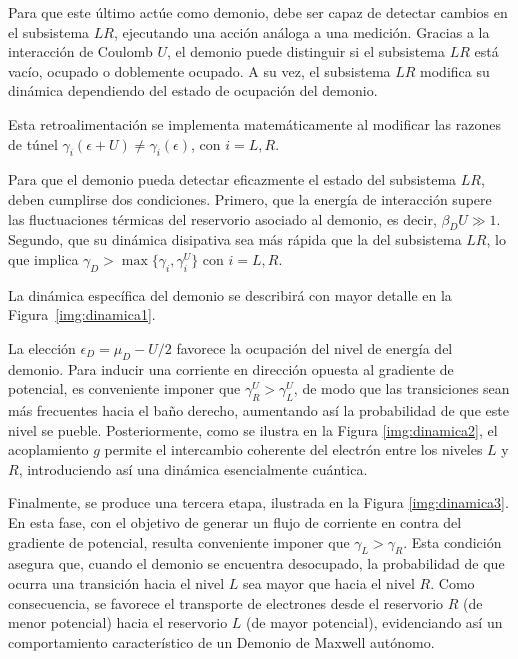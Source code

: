 Para que este último actúe como demonio, debe ser capaz de detectar cambios en el subsistema $LR$, ejecutando una acción análoga a una medición. Gracias a la interacción de Coulomb $U$, el demonio puede distinguir si el subsistema $LR$ está vacío, ocupado o doblemente ocupado. A su vez, el subsistema $LR$ modifica su dinámica dependiendo del estado de ocupación del demonio.

Esta retroalimentación se implementa matemáticamente al modificar las razones de túnel $\gamma_{i}(\epsilon + U) \neq \gamma_{i}(\epsilon)$, con $i = L, R$. 

Para que el demonio pueda detectar eficazmente el estado del subsistema $LR$, deben cumplirse dos condiciones. Primero, que la energía de interacción supere las fluctuaciones térmicas del reservorio asociado al demonio, es decir, $\beta_{D} U \gg 1$. Segundo, que su dinámica disipativa sea más rápida que la del subsistema $LR$, lo que implica $\gamma_{D} > \max\{\gamma_{i}, \gamma^{U}_{i}\}$ con $i = L, R$.

La dinámica específica del demonio se describirá con mayor detalle en la Figura~\ref{img:dinamica1}.


La elección $\epsilon_D = \mu_D - U/2$ favorece la ocupación del nivel de energía del demonio. Para inducir una corriente en dirección opuesta al gradiente de potencial, es conveniente imponer que $\gamma^{U}_{R} > \gamma^{U}_{L}$, de modo que las transiciones sean más frecuentes hacia el baño derecho, aumentando así la probabilidad de que este nivel se pueble. Posteriormente, como se ilustra en la Figura \ref{img:dinamica2}, el acoplamiento $g$ permite el intercambio coherente del electrón entre los niveles $L$ y $R$, introduciendo así una dinámica esencialmente cuántica.



Finalmente, se produce una tercera etapa, ilustrada en la Figura \ref{img:dinamica3}. En esta fase, con el objetivo de generar un flujo de corriente en contra del gradiente de potencial, resulta conveniente imponer que $\gamma_{L} > \gamma_{R}$. Esta condición asegura que, cuando el demonio se encuentra desocupado, la probabilidad de que ocurra una transición hacia el nivel $L$ sea mayor que hacia el nivel $R$. Como consecuencia, se favorece el transporte de electrones desde el reservorio $R$ (de menor potencial) hacia el reservorio $L$ (de mayor potencial), evidenciando así un comportamiento característico de un Demonio de Maxwell autónomo.


